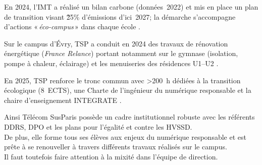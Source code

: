 En 2024, l’IMT a réalisé un bilan carbone (données~2022) et mis en place un plan de transition visant \~25\% d’émissions d’ici~2027; la démarche 
s’accompagne d’actions «\,\emph{éco-campus}\,» dans chaque école \cite{transition}.

Sur le campus d’Évry, TSP a conduit en 2024 des travaux de rénovation énergétique (\emph{France Relance}) portant notamment sur le gymnase (isolation, pompe à chaleur, éclairage) et les menuiseries des résidences U1–U2 \cite{renov}.

En 2025, TSP renforce le tronc commun avec >200~h dédiées à la transition écologique (8~ECTS), une Charte de l’ingénieur du numérique responsable et la chaire d’enseignement INTEGRATE \cite{ddrs}.




Ainsi Télécom SusParis possède un cadre institutionnel robuste avec les référents DDRS, DPO et les plans pour l'égalité et contre les HVSSD.\\
De plus, elle forme tous ses élèves aux enjeux du numérique responsable et est prête à se renouveller à travers différents travaux réalisés sur le campus.\\
Il faut toutefois faire attention à la mixité dans l'équipe de direction.
